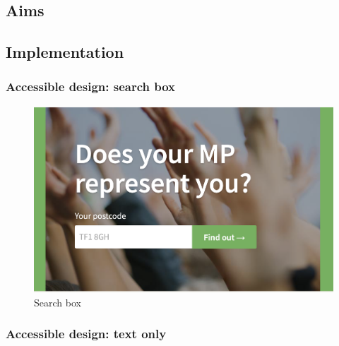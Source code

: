 \documentclass{article}
\begin{document}
        \subsection*{Aims}
        
        
        \subsection*{Implementation}
        
        	\subsubsection*{Accessible design: search box}
        	

			\begin{figure}
				\centering
				\includegraphics[scale=0.20]{images/they-work-for-you-implementation-search-box}
				\caption{Search box}
				\label{fig:they-work-for-you-implementation-search-box}
			\end{figure}
        	
        	\subsubsection*{Accessible design: text only}
        	
\end{document}
